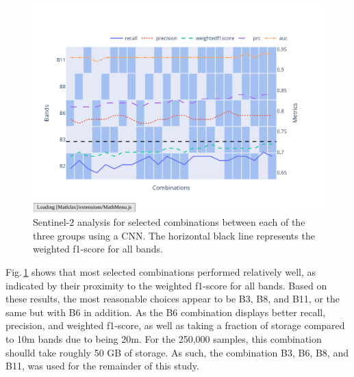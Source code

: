 \begin{figure}[ht]
    \centering
    \includegraphics[width=0.9\linewidth, trim={20pt 40pt 10pt 30pt}, clip]{figures/figures_analysis/band_selection_further.pdf}
    \caption{Sentinel-2 analysis for selected combinations between each of the three groups using a CNN. The horizontal black line represents the weighted f1-score for all bands.}
    \label{fig:band_selection_further}
\end{figure}

Fig.\,\ref{fig:band_selection_further} shows that most selected combinations performed relatively well, as indicated by their proximity to the weighted f1-score for all bands. Based on these results, the most reasonable choices appear to be B3, B8, and B11, or the same but with B6 in addition. As the B6 combination displays better recall, precision, and weighted f1-score, as well as taking a fraction of storage compared to 10m bands due to being 20m. For the 250,000 samples, this combination shoulld take roughly 50 GB of storage. As such, the combination B3, B6, B8, and B11, was used for the remainder of this study.